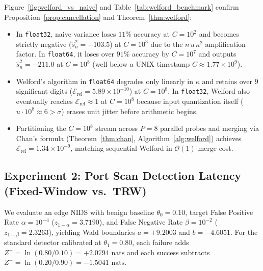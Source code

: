 \documentclass[oneside,noexaminfo,english]{sapthesis}
\numberwithin{equation}{section}
\numberwithin{figure}{section}
\numberwithin{table}{section}
\theoremstyle{compactplain}
\theoremstyle{compactdef}
\theoremstyle{compactrem}
\begin{document}
Figure~\ref{fig:welford_vs_naive} and Table~\ref{tab:welford_benchmark} confirm Proposition~\ref{prop:cancellation} and Theorem~\ref{thm:welford}:\nopagebreak
\begin{itemize}
    \item In \texttt{float32}, naive variance loses $11\%$ accuracy at $C=10^2$ and becomes strictly negative ($\hat{s}_n^2 = -103.5$) at $C=10^3$ due to the $n\,u\,\kappa^2$ amplification factor. In \texttt{float64}, it loses over $91\%$ accuracy by $C=10^7$ and outputs $\hat{s}_n^2 = -211.0$ at $C=10^8$ (well below a UNIX timestamp $C \approx 1.77 \times 10^9$).
    \item Welford's algorithm in \texttt{float64} degrades only linearly in $\kappa$ and retains over $9$ significant digits ($\mathcal{E}_{\mathrm{rel}} = 5.89 \times 10^{-10}$) at $C = 10^8$. In \texttt{float32}, Welford also eventually reaches $\mathcal{E}_{\mathrm{rel}} \approx 1$ at $C = 10^8$ because input quantization itself ($u \cdot 10^8 \approx 6 > \sigma$) erases unit jitter before arithmetic begins.
    \item Partitioning the $C = 10^8$ stream across $P = 8$ parallel probes and merging via Chan's formula (Theorem~\ref{thm:chan}, Algorithm~\ref{alg:welford}) achieves $\mathcal{E}_{\mathrm{rel}} = 1.34 \times 10^{-9}$, matching sequential Welford in $\mathcal{O}(1)$ merge cost.
\end{itemize}

\subsection{Experiment 2: Port Scan Detection Latency (Fixed-Window vs.\ TRW)}
We evaluate an edge NIDS with benign baseline $\theta_0 = 0.10$, target False Positive Rate $\alpha = 10^{-4}$ ($z_{1-\alpha} = 3.7190$), and False Negative Rate $\beta = 10^{-2}$ ($z_{1-\beta} = 2.3263$), yielding Wald boundaries $a = +9.2003$ and $b = -4.6051$. For the standard detector calibrated at $\theta_1 = 0.80$, each failure adds $Z^+ = \ln(0.80/0.10) = +2.0794\text{ nats}$ and each success subtracts $Z^- = \ln(0.20/0.90) = -1.5041\text{ nats}$.
\end{document}
